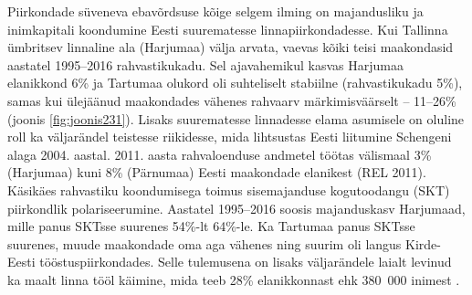\documentclass[]{book}
\begin{document}
Piirkondade süveneva ebavõrdsuse kõige selgem ilming on majandusliku ja inimkapitali koondumine Eesti
suurematesse linnapiirkondadesse. Kui Tallinna ümbritsev linnaline ala (Harjumaa) välja arvata, vaevas kõiki
teisi maakondasid aastatel 1995--2016 rahvastikukadu. Sel ajavahemikul kasvas Harjumaa elanikkond 6\% ja
Tartumaa olukord oli suhteliselt stabiilne (rahvastikukadu 5\%), samas kui ülejäänud maakondades vähenes
rahvaarv märkimisväärselt -- 11--26\% (joonis \ref{fig:joonis231}). Lisaks suurematesse linnadesse elama asumisele on oluline
roll ka väljarändel teistesse riikidesse, mida lihtsustas Eesti liitumine Schengeni alaga 2004. aastal. 2011.
aasta rahvaloenduse andmetel töötas välismaal 3\% (Harjumaa) kuni 8\% (Pärnumaa) Eesti maakondade
elanikest (REL 2011). Käsikäes rahvastiku koondumisega toimus sisemajanduse kogutoodangu (SKT)
piirkondlik polariseerumine. Aastatel 1995--2016 soosis majanduskasv Harjumaad, mille panus SKTsse
suurenes 54\%-lt 64\%-le. Ka Tartumaa panus SKTsse suurenes, muude maakondade oma aga vähenes ning
suurim oli langus Kirde-Eesti tööstuspiirkondades. Selle tulemusena on lisaks väljarändele laialt levinud ka
maalt linna tööl käimine, mida teeb 28\% elanikkonnast ehk 380~000 inimest \autocite{ahas2011}.
\end{document}
